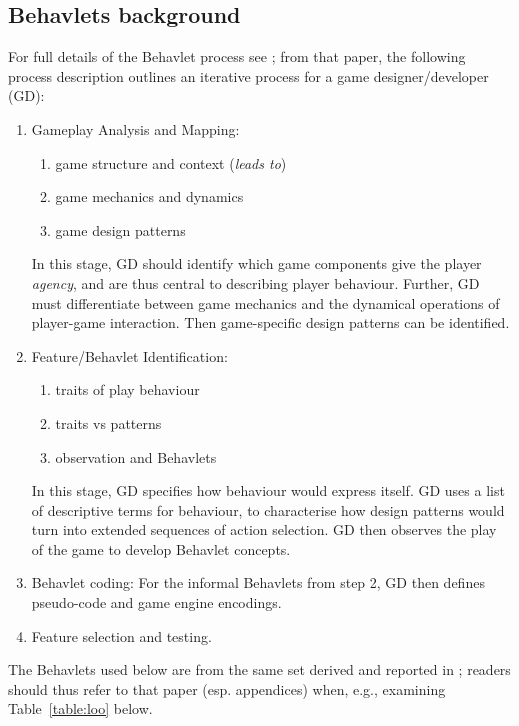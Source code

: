 \documentclass[conference]{IEEEtran}
\begin{document}
\subsection{Behavlets background}
\label{behav}
For full details of the Behavlet process see \cite{Cowley2016behavlet}; from that paper, the following process description outlines an iterative process for a game designer/developer (GD):

\begin{enumerate}
	\item Gameplay Analysis and Mapping:
	\begin{enumerate}
		\item game structure and context (\textit{leads to}) 
		\item game mechanics and dynamics 
		\item game design patterns
	\end{enumerate}
	In this stage, GD should identify which game components give the player \textit{agency}, and are thus central to describing player behaviour. Further, GD must differentiate between game mechanics and the dynamical operations of player-game interaction. Then game-specific design patterns can be identified.

	\item Feature/Behavlet Identification:
	\begin{enumerate}
		\item traits of play behaviour 
		\item traits vs patterns 
		\item observation and Behavlets
	\end{enumerate}
	In this stage, GD specifies how behaviour would express itself. GD uses a list of descriptive terms for behaviour, to characterise how design patterns would turn into extended sequences of action selection. GD then observes the play of the game to develop Behavlet concepts.

	\item Behavlet coding:
	For the informal Behavlets from step 2, GD then defines pseudo-code and game engine encodings.

	\item Feature selection and testing.
\end{enumerate}

The Behavlets used below are from the same set derived and reported in \cite{Cowley2016behavlet}; readers should thus refer to that paper (esp. appendices) when, e.g., examining Table~\ref{table:loo} below.
\end{document}

